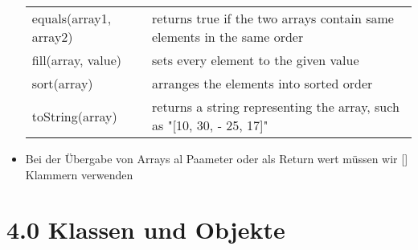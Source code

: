 \documentclass[11pt]{article}
\begin{document}
\begin{itemize}
\begin{center}
\begin{tabular}{ll}
equals(array1, array2) & returns true if the two arrays contain same elements in the same order\\
fill(array, value) & sets every element to the given value\\
sort(array) & arranges the elements into sorted order\\
toString(array) & returns a string representing the array, such as "[10, 30, - 25, 17]"\\
\end{tabular}
\end{center}
\item Bei der Übergabe von Arrays al Paameter oder als Return wert müssen wir [] Klammern verwenden\\
\end{itemize}

\section{4.0 Klassen und Objekte}
\label{sec:orgaf1ffc5}
\end{document}
